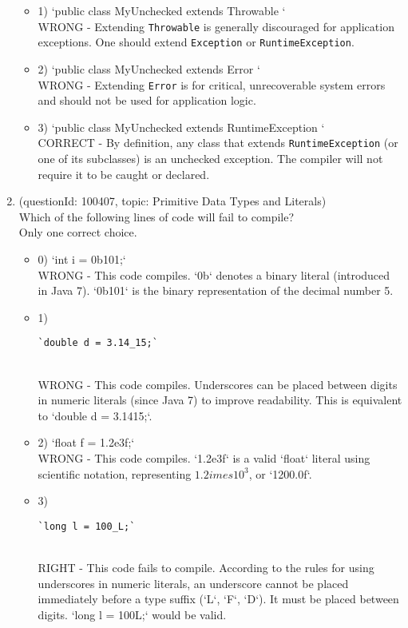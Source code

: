 \documentclass[12pt]{article}
\begin{document}
\begin{enumerate}[label=(\arabic*)]
\begin{itemize}
\item 1) `public class MyUnchecked extends Throwable { }`
 \\ 
WRONG - Extending \verb|Throwable| is generally discouraged for application exceptions. One should extend \verb|Exception| or \verb|RuntimeException|.

\item 2) `public class MyUnchecked extends Error { }`
 \\ 
WRONG - Extending \verb|Error| is for critical, unrecoverable system errors and should not be used for application logic.

\item 3) `public class MyUnchecked extends RuntimeException { }`
 \\ 
CORRECT - By definition, any class that extends \verb|RuntimeException| (or one of its subclasses) is an unchecked exception. The compiler will not require it to be caught or declared.

\end{itemize}
\item (questionId: 100407, topic: Primitive Data Types and Literals) \\ 
Which of the following lines of code will fail to compile?
\\ \noindent Only one correct choice. 
\begin{itemize}
\item 0) `int i = 0b101;`
 \\ 
WRONG - This code compiles. `0b` denotes a binary literal (introduced in Java 7). `0b101` is the binary representation of the decimal number 5.

\item 1) \begin{verbatim}`double d = 3.14_15;`\end{verbatim}
 \\ 
WRONG - This code compiles. Underscores can be placed between digits in numeric literals (since Java 7) to improve readability. This is equivalent to `double d = 3.1415;`.

\item 2) `float f = 1.2e3f;`
 \\ 
WRONG - This code compiles. `1.2e3f` is a valid `float` literal using scientific notation, representing $1.2 	imes 10^3$, or `1200.0f`.

\item 3) \begin{verbatim}`long l = 100_L;`\end{verbatim}
 \\ 
RIGHT - This code fails to compile. According to the rules for using underscores in numeric literals, an underscore cannot be placed immediately before a type suffix (`L`, `F`, `D`). It must be placed between digits. `long l = 100L;` would be valid.


\end{itemize}
\end{enumerate}
\end{document}
